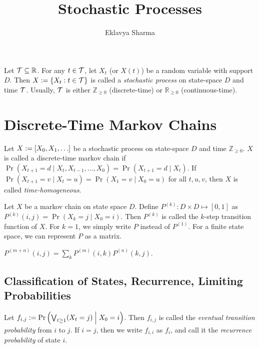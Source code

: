 \documentclass[a4paper, 12pt, fleqn]{article}
\author{Eklavya Sharma}
\date{\empty}
\title{Stochastic Processes}
\begin{document}
\maketitle
\setlength{\parskip}{0.2em}

\begin{definition}
Let $\mathcal{T} \subseteq \mathbb{R}$. For any $t \in \mathcal{T}$,
let $X_t$ (or $X(t)$) be a random variable with support $D$.
Then $X := \{X_t: t \in \mathcal{T}\}$ is called a
\emph{stochastic process} on state-space $D$ and time $\mathcal{T}$.
Usually, $\mathcal{T}$ is either $\mathbb{Z}_{\ge 0}$ (discrete-time)
or $\mathbb{R}_{\ge 0}$ (continuous-time).
\end{definition}

\section{Discrete-Time Markov Chains}

\begin{definition}
Let $X := [X_0, X_1, \ldots]$ be a stochastic process
on state-space $D$ and time $\mathbb{Z}_{\ge 0}$.
$X$ is called a discrete-time markov chain if
$\Pr(X_{t+1}=d \mid X_t, X_{t-1}, \ldots, X_0) = \Pr(X_{t+1}=d \mid X_t)$.
If $\Pr(X_{t+1}=v \mid X_t=u) = \Pr(X_1=v \mid X_0=u)$ for all $t, u, v$,
then $X$ is called \emph{time-homogeneous}.
\end{definition}

\begin{definition}
Let $X$ be a markov chain on state space $D$.
Define $P^{(k)}: D \times D \mapsto [0, 1]$ as $P^{(k)}(i, j) = \Pr(X_k = j \mid X_0 = i)$.
Then $P^{(k)}$ is called the $k$-step transition function of $X$.
For $k = 1$, we simply write $P$ instead of $P^{(1)}$.
For a finite state space, we can represent $P$ as a matrix.
\end{definition}

\begin{lemma}
$P^{(m+n)}(i, j) = \sum_{k}P^{(m)}(i, k)P^{(n)}(k, j)$.
\end{lemma}

\subsection{Classification of States, Recurrence, Limiting Probabilities}

\begin{definition}
Let $f_{i,j} := \Pr\left(\bigvee_{t \ge 1} (X_t = j) \Bigm| X_0 = i\right)$.
Then $f_{i,j}$ is called the \emph{eventual transition probability} from $i$ to $j$.
If $i = j$, then we write $f_{i,i}$ as $f_i$, and call it
the \emph{recurrence probability} of state $i$.
\end{definition}
\end{document}

